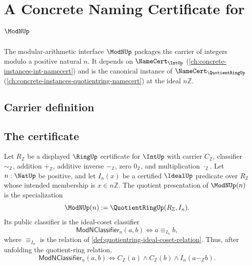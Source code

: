 \chapter{A Concrete Naming Certificate for $\ModNUp$}
\label{ch:concrete-instances-modn-namecert}

The modular-arithmetic interface $\ModNUp$ packages the carrier of integers modulo a positive natural $n$. It depends on $\NameCert_{\IntUp}$ (\autoref{ch:concrete-instances-int-namecert}) and is the canonical instance of $\NameCert_{\QuotientRingUp}$ (\autoref{ch:concrete-instances-quotientring-namecert}) at the ideal $n\mathbb{Z}$.

\section{Carrier definition}
\label{sec:modn-carrier}

\section{The certificate}
\label{sec:modn-certificate}

\begin{definition}
\label{def:modn-nz-quotient-presentation}
Let $R_{\mathbb{Z}}$ be a displayed $\RingUp$ certificate for $\IntUp$ with carrier $C_{\mathbb{Z}}$, classifier $\sim_{\mathbb{Z}}$, addition $+_{\mathbb{Z}}$, additive inverse $-_{\mathbb{Z}}$, zero $0_{\mathbb{Z}}$, and multiplication $\cdot_{\mathbb{Z}}$. Let $n:\NatUp$ be positive, and let $I_n(x)$ be a certified $\IdealUp$ predicate over $R_{\mathbb{Z}}$ whose intended membership is $x\in n\mathbb{Z}$. The quotient presentation of $\ModNUp(n)$ is the specialization
$$
\ModNUp(n):=\QuotientRingUp(R_{\mathbb{Z}},I_n).
$$
Its public classifier is the ideal-coset classifier
$$
\mathsf{ModNClassifier}_n(a,b)\Longleftrightarrow a\equiv_{I_n}b,
$$
where $\equiv_{I_n}$ is the relation of \autoref{def:quotientring-ideal-coset-relation}. Thus, after unfolding the quotient-ring relation,
$$
\mathsf{ModNClassifier}_n(a,b)\Longleftrightarrow
C_{\mathbb{Z}}(a)\land C_{\mathbb{Z}}(b)\land I_n(a-_{\mathbb{Z}}b).
$$
\end{definition}

